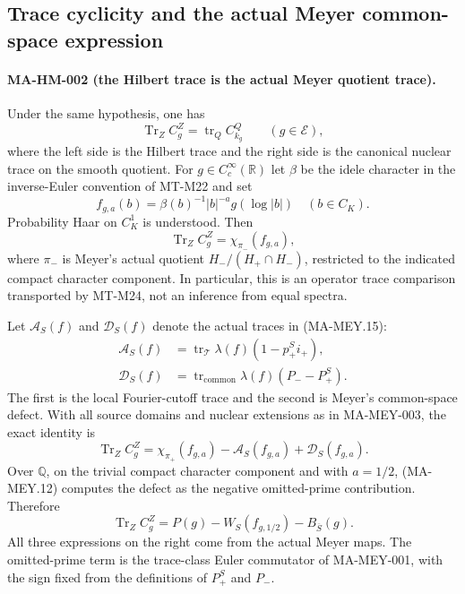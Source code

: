 \subsection{Trace cyclicity and the actual Meyer common-space expression}

\paragraph{MA-HM-002 (the Hilbert trace is the actual Meyer quotient trace).}
Under the same hypothesis, one has
\[
 \operatorname{Tr}_{Z}C_g^Z
       =\operatorname{tr}_{Q}C_{k_g}^Q
       \qquad(g\in\mathcal E),
 \tag{MA-HM.14}
\]
where the left side is the Hilbert trace and the right side
is the canonical nuclear trace on the smooth quotient.
For $g\in C_c^\infty(\mathbb R)$ let $\beta$ be the idele
character in the inverse-Euler convention of MT-M22 and set
\[
       f_{g,a}(b)=\beta(b)^{-1}|b|^{-a}g(\log|b|)
                \quad(b\in C_K).
 \tag{MA-HM.15}
\]
Probability Haar on $C_K^1$ is understood.  Then
\[
       \operatorname{Tr}_{Z}C_g^Z
                 =\chi_{\pi_-}(f_{g,a}),
 \tag{MA-HM.16}
\]
where $\pi_-$ is Meyer's actual quotient
$H_-/(H_+\cap H_-)$, restricted to the indicated compact
character component.  In particular, this is an operator
trace comparison transported by MT-M24, not an inference
from equal spectra.

Let $\mathcal A_S(f)$ and $\mathcal D_S(f)$ denote the actual
traces in (MA-MEY.15):
\[
 \begin{aligned}
 \mathcal A_S(f)
   &=\operatorname{tr}_{\mathcal T}
           \lambda(f)(1-p_+^Si_+),\\
 \mathcal D_S(f)
   &=\operatorname{tr}_{\mathrm{common}}
           \lambda(f)(P_- -P_+^S).
 \end{aligned}
 \tag{MA-HM.17}
\]
The first is the local Fourier-cutoff trace and the second
is Meyer's common-space defect.  With all source domains
and nuclear extensions as in MA-MEY-003, the exact identity is
\[
       \boxed{\displaystyle
       \operatorname{Tr}_{Z}C_g^Z
          =\chi_{\pi_+}(f_{g,a})
                 -\mathcal A_S(f_{g,a})
                 +\mathcal D_S(f_{g,a}).}
 \tag{MA-HM.18}
\]
Over $\mathbb Q$, on the trivial compact character component
and with $a=1/2$, (MA-MEY.12) computes the defect as the
negative omitted-prime contribution.  Therefore
\[
       \operatorname{Tr}_{Z}C_g^Z
           =P(g)-W_S(f_{g,1/2})-B_{\overline S}(g).
 \tag{MA-HM.19}
\]
All three expressions on the right come from the actual
Meyer maps.  The omitted-prime term is the trace-class
Euler commutator of MA-MEY-001, with the sign fixed from
the definitions of $P_+^S$ and $P_-$.


